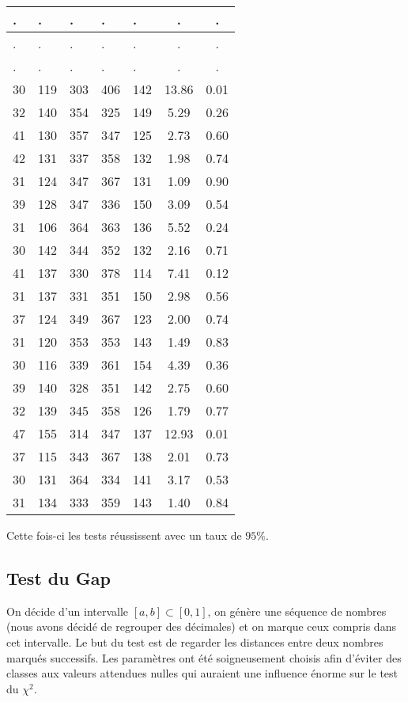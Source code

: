 \documentclass[12pt,a4paper]{article}
\begin{document}
\begin{center}
\begin{tabular}{|l|l|l|l|l|c|c|}
 . & . & . & . & . & . & . \\ \hline
 . & . & . & . & . & . & . \\ \hline
 . & . & . & . & . & . & . \\ \hline
30 & 119 & 303 & 406 & 142 & 13.86 &  0.01\\ \hline
32 & 140 & 354 & 325 & 149 &  5.29 &  0.26\\ \hline
41 & 130 & 357 & 347 & 125 &  2.73 &  0.60\\ \hline
42 & 131 & 337 & 358 & 132 &  1.98 &  0.74\\ \hline
31 & 124 & 347 & 367 & 131 &  1.09 &  0.90\\ \hline
39 & 128 & 347 & 336 & 150 &  3.09 &  0.54\\ \hline
31 & 106 & 364 & 363 & 136 &  5.52 &  0.24\\ \hline
30 & 142 & 344 & 352 & 132 &  2.16 &  0.71\\ \hline
41 & 137 & 330 & 378 & 114 &  7.41 &  0.12\\ \hline
31 & 137 & 331 & 351 & 150 &  2.98 &  0.56\\ \hline
37 & 124 & 349 & 367 & 123 &  2.00 &  0.74\\ \hline
31 & 120 & 353 & 353 & 143 &  1.49 &  0.83\\ \hline
30 & 116 & 339 & 361 & 154 &  4.39 &  0.36\\ \hline
39 & 140 & 328 & 351 & 142 &  2.75 &  0.60\\ \hline
32 & 139 & 345 & 358 & 126 &  1.79 &  0.77\\ \hline
47 & 155 & 314 & 347 & 137 & 12.93 &  0.01\\ \hline
37 & 115 & 343 & 367 & 138 &  2.01 &  0.73\\ \hline
30 & 131 & 364 & 334 & 141 &  3.17 &  0.53\\ \hline
31 & 134 & 333 & 359 & 143 &  1.40 &  0.84\\ \hline
\end{tabular}
\end{center}

Cette fois-ci les tests réussissent avec un taux de $95\%$.


\subsection{Test du Gap}
On décide d'un intervalle $[a,b] \subset [0,1]$,
on génère une séquence de nombres (nous avons décidé de regrouper des décimales)
et on marque ceux compris dans cet intervalle. Le but du test est de regarder les
distances entre deux nombres marqués successifs.
Les paramètres ont été soigneusement choisis
afin d'éviter des classes aux valeurs attendues nulles
qui auraient une influence énorme sur le test du $\chi^2$.
\end{document}
